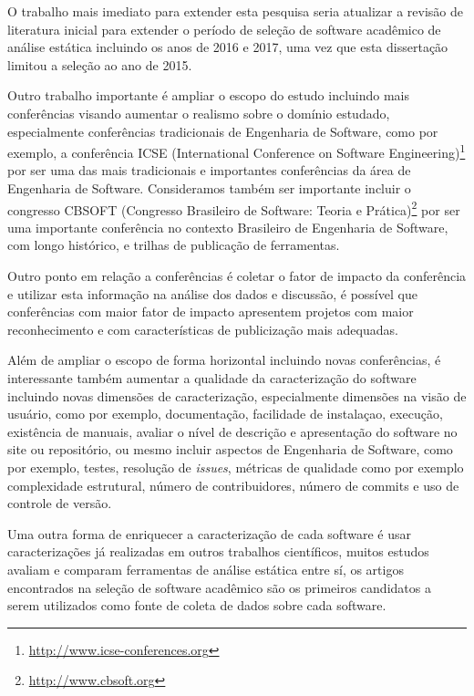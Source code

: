 O trabalho mais imediato para extender esta pesquisa seria atualizar a revisão
de literatura inicial para extender o período de seleção de software acadêmico
de análise estática incluindo os anos de 2016 e 2017, uma vez que esta
dissertação limitou a seleção ao ano de 2015.

Outro trabalho importante é ampliar o escopo do estudo incluindo mais
conferências visando aumentar o realismo sobre o domínio estudado,
especialmente conferências tradicionais de Engenharia de Software, como por
exemplo, a conferência ICSE (International Conference on Software
Engineering)\footnote{\url{http://www.icse-conferences.org}} por ser uma das
mais tradicionais e importantes conferências da área de Engenharia de Software.
Consideramos também ser importante incluir o congresso CBSOFT (Congresso
Brasileiro de Software: Teoria e Prática)\footnote{\url{http://www.cbsoft.org}}
por ser uma importante conferência no contexto Brasileiro de Engenharia de
Software, com longo histórico, e trilhas de publicação de ferramentas.

Outro ponto em relação a conferências é coletar o fator de impacto da
conferência e utilizar esta informação na análise dos dados e discussão, é
possível que conferências com maior fator de impacto apresentem projetos com
maior reconhecimento e com características de publicização mais adequadas.

Além de ampliar o escopo de forma horizontal incluindo novas conferências, é
interessante também aumentar a qualidade da caracterização do software
incluindo novas dimensões de caracterização, especialmente dimensões na visão
de usuário, como por exemplo, documentação, facilidade de instalaçao, execução,
existência de manuais, avaliar o nível de descrição e apresentação do software
no site ou repositório, ou mesmo incluir aspectos de Engenharia de Software,
como por exemplo, testes, resolução de {\it issues}, métricas de qualidade como
por exemplo complexidade estrutural, número de contribuidores, número de
commits e uso de controle de versão.


Uma outra forma de enriquecer a caracterização de cada software é usar
caracterizações já realizadas em outros trabalhos científicos, muitos estudos
avaliam e comparam ferramentas de análise estática entre sí, os artigos
encontrados na seleção de software acadêmico são os primeiros candidatos a
serem utilizados como fonte de coleta de dados sobre cada software.

